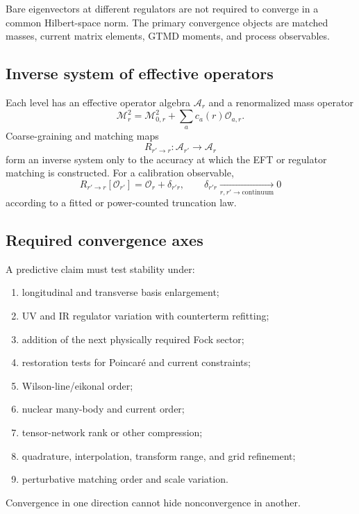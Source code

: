 \documentclass[11pt]{article}
\newcommand{\Alg}{\mathcal A}
\newcommand{\cO}{\mathcal O}
\newcommand{\cM}{\mathcal M}
\begin{document}
Bare eigenvectors at different regulators are not required to converge in a
common Hilbert-space norm.  The primary convergence objects are matched
masses, current matrix elements, GTMD moments, and process observables.

\subsection{Inverse system of effective operators}

Each level has an effective operator algebra \(\Alg_r\) and a renormalized
mass operator
\begin{equation}
 \cM_r^2=\cM_{0,r}^2+\sum_a c_a(r)\cO_{a,r}.
\label{eq:effective-mass-operator}
\end{equation}
Coarse-graining and matching maps
\begin{equation}
 R_{r'\to r}:\Alg_{r'}\longrightarrow\Alg_r
\label{eq:operator-inverse-system}
\end{equation}
form an inverse system only to the accuracy at which the EFT or regulator
matching is constructed.  For a calibration observable,
\begin{equation}
 R_{r'\to r}[\cO_{r'}]
 =\cO_r+\delta_{r'r},
 \qquad
 \delta_{r'r}\xrightarrow[r,r'\to\mathrm{continuum}]{}0
\label{eq:projective-observable-consistency}
\end{equation}
according to a fitted or power-counted truncation law.

\subsection{Required convergence axes}

A predictive claim must test stability under:
\begin{enumerate}
\item longitudinal and transverse basis enlargement;
\item UV and IR regulator variation with counterterm refitting;
\item addition of the next physically required Fock sector;
\item restoration tests for Poincar\'e and current constraints;
\item Wilson-line/eikonal order;
\item nuclear many-body and current order;
\item tensor-network rank or other compression;
\item quadrature, interpolation, transform range, and grid refinement;
\item perturbative matching order and scale variation.
\end{enumerate}
Convergence in one direction cannot hide nonconvergence in another.
\end{document}
